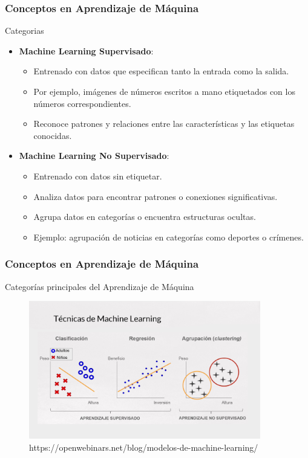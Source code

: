 \documentclass{beamer}
\begin{document}
\begin{frame}
	\frametitle{Conceptos en Aprendizaje de Máquina}
		\begin{block}{Categorias}
	
	\begin{itemize}
		\item \textbf{Machine Learning Supervisado}:
		\begin{itemize}
			\item Entrenado con datos que especifican tanto la entrada como la salida.
			\item Por ejemplo, imágenes de números escritos a mano etiquetados con los números correspondientes.
			\item Reconoce patrones y relaciones entre las características y las etiquetas conocidas.
		\end{itemize}
		
		\item \textbf{Machine Learning No Supervisado}:
		\begin{itemize}
			\item Entrenado con datos sin etiquetar.
			\item Analiza datos para encontrar patrones o conexiones significativas.
			\item Agrupa datos en categorías o encuentra estructuras ocultas.
			\item Ejemplo: agrupación de noticias en categorías como deportes o crímenes.
		\end{itemize}
	\end{itemize}
		\end{block}
\end{frame}

\begin{frame}
	\frametitle{Conceptos en Aprendizaje de Máquina}
\begin{block}{Categorías principales del Aprendizaje de Máquina}	
\begin{figure}
	\includegraphics[width=0.9\textwidth]{supervisado_nosupervisado}
	\caption{https://openwebinars.net/blog/modelos-de-machine-learning/}
\end{figure}
\end{block}
\end{frame}
\end{document}
